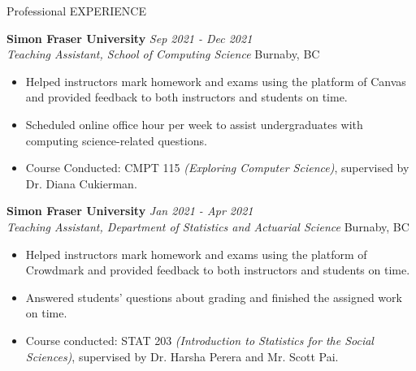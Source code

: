\documentclass{resume} %
\begin{document}
\begin{rSection}{Professional EXPERIENCE}

{\bf Simon Fraser University} \hfill {\em Sep 2021 - Dec 2021} 
\\{\textit{Teaching Assistant, School of Computing Science} \hfill {Burnaby, BC}}
\begin{itemize}
    \vspace{-0.2cm}\item Helped instructors mark homework and exams using the platform of Canvas and provided feedback to both instructors and students on time. 
    \vspace{-0.2cm}\item Scheduled online office hour per week to assist undergraduates with computing science-related questions.
    \vspace{-0.2cm}\item Course Conducted: CMPT 115 \textit{(Exploring Computer Science)}, supervised by Dr. Diana Cukierman.
\end{itemize}

{\bf Simon Fraser University} \hfill {\em Jan 2021 - Apr 2021} 
\\{\textit{Teaching Assistant, Department of Statistics and Actuarial Science} \hfill {Burnaby, BC}}
\begin{itemize}
    \vspace{-0.2cm}\item Helped instructors mark homework and exams using the platform of Crowdmark and provided feedback to both instructors and students on time. 
    \vspace{-0.2cm}\item Answered students’ questions about grading  and finished the assigned work on time.
    \vspace{-0.2cm}\item Course conducted: STAT 203 \textit{(Introduction to Statistics for the Social Sciences)}, supervised by Dr. Harsha Perera and Mr. Scott Pai.
\end{itemize}


\end{rSection}
\end{document}
